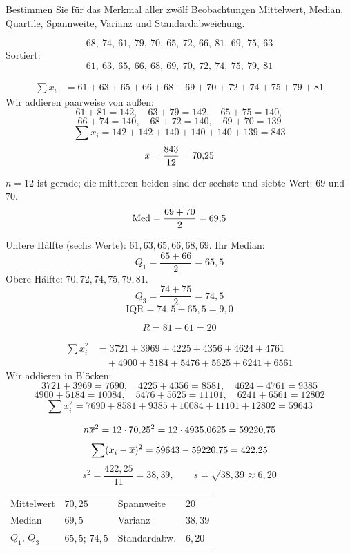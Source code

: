\begin{aufgabe}
Bestimmen Sie für das Merkmal  aller zwölf Beobachtungen Mittelwert, Median, Quartile, Spannweite, Varianz und Standardabweichung.

\loesung
{}
\[ 68,\ 74,\ 61,\ 79,\ 70,\ 65,\ 72,\ 66,\ 81,\ 69,\ 75,\ 63 \]
Sortiert:
\[ 61,\ 63,\ 65,\ 66,\ 68,\ 69,\ 70,\ 72,\ 74,\ 75,\ 79,\ 81 \]

\begin{align*}
\sum x_i &= 61+63+65+66+68+69+70+72+74+75+79+81
\end{align*}
Wir addieren paarweise von außen:
\[ 61+81 = 142, \quad 63+79 = 142, \quad 65+75 = 140, \]
\[ 66+74 = 140, \quad 68+72 = 140, \quad 69+70 = 139 \]
\[ \sum x_i = 142+142+140+140+140+139 = 843 \]
\[ \overline{x} = \frac{843}{12} = 70{,}25 \]

$n = 12$ ist gerade; die mittleren beiden sind der sechste und siebte Wert: $69$ und $70$.
\[ \operatorname{Med} = \frac{69+70}{2} = 69{,}5 \]

Untere Hälfte (sechs Werte): $61,63,65,66,68,69$. Ihr Median:
\[ Q_1 = \frac{65+66}{2} = 65{,}5 \]
Obere Hälfte: $70,72,74,75,79,81$.
\[ Q_3 = \frac{74+75}{2} = 74{,}5 \]
\[ \mathrm{IQR} = 74{,}5 - 65{,}5 = 9{,}0 \]

\[ R = 81 - 61 = 20 \]

\begin{align*}
\sum x_i^2 &= 3721+3969+4225+4356+4624+4761\\
&\quad + 4900+5184+5476+5625+6241+6561
\end{align*}
Wir addieren in Blöcken:
\[ 3721+3969 = 7690, \quad 4225+4356 = 8581, \quad 4624+4761 = 9385 \]
\[ 4900+5184 = 10084, \quad 5476+5625 = 11101, \quad 6241+6561 = 12802 \]
\[ \sum x_i^2 = 7690+8581+9385+10084+11101+12802 = 59643 \]

\[ n\overline{x}^2 = 12 \cdot 70{,}25^2 = 12 \cdot 4935{,}0625 = 59220{,}75 \]
\[ \sum(x_i-\overline{x})^2 = 59643 - 59220{,}75 = 422{,}25 \]
\[ s^2 = \frac{422{,}25}{11} = 38{,}39, \qquad s = \sqrt{38{,}39} \approx 6{,}20 \]

\begin{center}
\renewcommand{\arraystretch}{1.42}
\begin{tabular}{@{}P{2.6cm}P{1.8cm}P{2.6cm}P{1.8cm}@{}}
\toprule
Mittelwert & $70{,}25$ & Spannweite & $20$\\
Median & $69{,}5$ & Varianz & $38{,}39$\\
$Q_1$, $Q_3$ & $65{,}5$; $74{,}5$ & Standardabw. & $6{,}20$\\
\bottomrule
\end{tabular}
\end{center}


\end{aufgabe}
